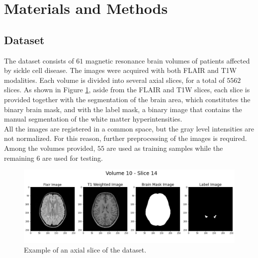 \documentclass[12pt]{extarticle}
\begin{document}
\section{Materials and Methods}
\subsection{Dataset}
The dataset consists of $61$ magnetic resonance brain volumes of patients affected by sickle cell disease. The images were acquired with both FLAIR and T1W modalities. Each volume is divided into several axial slices, for a total of $5562$ slices. As shown in Figure \ref{fig:dataset_example}, aside from the FLAIR and T1W slices, each slice is provided together with the segmentation of the brain area, which constitutes the binary brain mask, and with the label mask, a binary image that contains the manual segmentation of the white matter hyperintensities. \\
All the images are registered in a common space, but the gray level intensities are not normalized. For this reason, further preprocessing of the images is required.\\
Among the volumes provided, $55$ are used as training samples while the remaining $6$ are used for testing. 
\begin{figure}[h!]
    \centering
    \includegraphics[width = \textwidth]{images/dataset_example.png}
    \caption{Example of an axial slice of the dataset.}
    \label{fig:dataset_example}
\end{figure}
\end{document}

